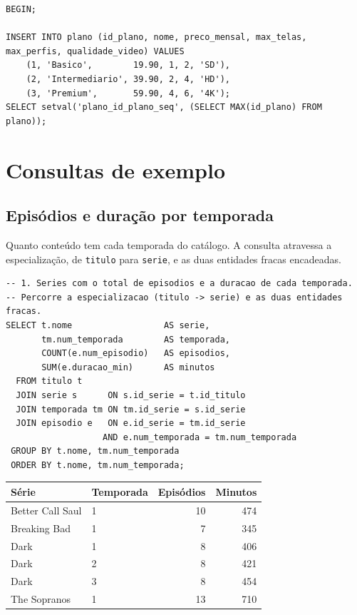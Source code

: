 \documentclass[a4paper,12pt,oneside,openany]{book}
\newcommand{\bd}[1]{\texttt{#1}}
\begin{document}
\begin{lstlisting}[caption={Início da carga, com a transação aberta.},label={lst:dml},basicstyle=\ttfamily\scriptsize]
BEGIN;

INSERT INTO plano (id_plano, nome, preco_mensal, max_telas, max_perfis, qualidade_video) VALUES
    (1, 'Basico',        19.90, 1, 2, 'SD'),
    (2, 'Intermediario', 39.90, 2, 4, 'HD'),
    (3, 'Premium',       59.90, 4, 6, '4K');
SELECT setval('plano_id_plano_seq', (SELECT MAX(id_plano) FROM plano));
\end{lstlisting}

\section{Consultas de exemplo}\label{sec:consultas}

\subsection{Episódios e duração por temporada}

Quanto conteúdo tem cada temporada do catálogo. A consulta atravessa a
especialização, de \bd{titulo} para \bd{serie}, e as duas entidades fracas
encadeadas.

\begin{lstlisting}[caption={Episódios e duração por temporada.},label={lst:consulta1},basicstyle=\ttfamily\scriptsize]
-- 1. Series com o total de episodios e a duracao de cada temporada.
-- Percorre a especializacao (titulo -> serie) e as duas entidades fracas.
SELECT t.nome                  AS serie,
       tm.num_temporada        AS temporada,
       COUNT(e.num_episodio)   AS episodios,
       SUM(e.duracao_min)      AS minutos
  FROM titulo t
  JOIN serie s      ON s.id_serie = t.id_titulo
  JOIN temporada tm ON tm.id_serie = s.id_serie
  JOIN episodio e   ON e.id_serie = tm.id_serie
                   AND e.num_temporada = tm.num_temporada
 GROUP BY t.nome, tm.num_temporada
 ORDER BY t.nome, tm.num_temporada;
\end{lstlisting}

\begin{table}[ht]
\centering
\begin{tabular}{llrr}
\toprule
\textbf{Série} & \textbf{Temporada} & \textbf{Episódios} & \textbf{Minutos} \\
\midrule
Better Call Saul & 1 & 10 & 474 \\
Breaking Bad     & 1 &  7 & 345 \\
Dark             & 1 &  8 & 406 \\
Dark             & 2 &  8 & 421 \\
Dark             & 3 &  8 & 454 \\
The Sopranos     & 1 & 13 & 710 \\
\bottomrule
\end{tabular}
\end{table}
\end{document}
